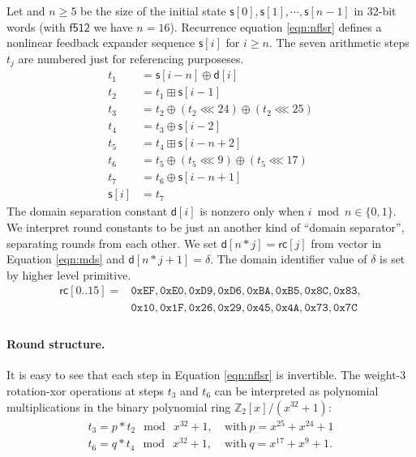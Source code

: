 \documentclass{iacrtrans}
\newcommand{\msf}[1]{\mathsf{#1}}
\newcommand{\mtt}[1]{\mathtt{#1}}
\begin{document}
	Let and $n \geq 5$ be the size of the initial state 
	$\msf{s}[0], \msf{s}[1], \cdots, \msf{s}[n-1]$ in 32-bit words 
	(with $\msf{f512}$ we have $n=16$).
	Recurrence equation \ref{eqn:nflsr} defines	a nonlinear feedback 
	expander sequence $\msf{s}[i]$ for $i \geq n$.
	The seven arithmetic steps $t_j$ are numbered just for referencing
	purposeses.
	\begin{equation}
	\label{eqn:nflsr}
	\begin{split}
	t_1 & = \msf{s}[i-n] \oplus \msf{d}[i]					\\
	t_2 & = t_1 \boxplus \msf{s}[i-1]						\\
	t_3 & = t_2 \oplus (t_2 \lll 24) \oplus (t_2 \lll 25)	\\
	t_4 & = t_3 \oplus   \msf{s}[i-2]						\\
	t_5 & = t_4 \boxplus \msf{s}[i-n+2]						\\
	t_6 & = t_5 \oplus (t_5 \lll 9) \oplus (t_5 \lll 17) 	\\
	t_7 & = t_6 \oplus \msf{s}[i-n+1]						\\
	\msf{s}[i] & = t_7
	\end{split}
	\end{equation}
	The domain separation constant $\msf{d}[i]$ is nonzero 
	only when $i \bmod n \in \{0, 1\}$. We interpret round constants
	to be just an another kind of ``domain separator'', separating rounds 
	from each other. We set $\msf{d}[n*j] = \msf{rc}[j]$ from vector in
	Equation \ref{eqn:mds} and $\msf{d}[n*j + 1] = \delta$.
	The domain identifier value of $\delta$ is set by higher level primitive.
	\begin{equation}
	\label{eqn:mds}
	\begin{split}
	\msf{rc}[0..15] = 
		& \mtt{0xEF, 0xE0, 0xD9, 0xD6, 0xBA, 0xB5, 0x8C, 0x83,} \\
		& \mtt{0x10, 0x1F, 0x26, 0x29, 0x45, 0x4A, 0x73, 0x7C} \\ 
	\end{split}
	\end{equation}

	\paragraph{Round structure.}
	It is easy to see that each step in Equation \ref{eqn:nflsr}
	is invertible. The weight-3 rotation-xor
	operations at steps $t_3$ and $t_6$ can be interpreted as polynomial
	multiplications in the binary polynomial ring 
	$\mathbb{Z}_2[x]/(x^{32}+1)$:
	\begin{align}
		t_3 = p * t_2 ~\bmod ~ x^{32}+1, &~ \text{with} ~ p=x^{25} + x^{24} + 1 \\
		t_6 = q * t_4 ~\bmod ~ x^{32}+1, &~ \text{with} ~ q=x^{17} + x^{9} + 1.
	\end{align}
\end{document}
